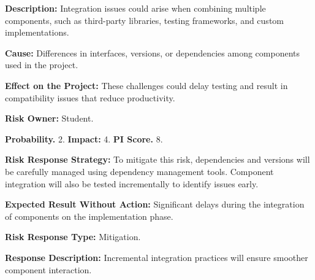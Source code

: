 \textbf{Description:} Integration issues could arise when combining multiple components, such as third-party libraries, testing frameworks, and custom implementations.

\textbf{Cause:} Differences in interfaces, versions, or dependencies among components used in the project.

\textbf{Effect on the Project:} These challenges could delay testing and result in compatibility issues that reduce productivity.

\textbf{Risk Owner:} Student.

\textbf{Probability.} 2. \textbf{Impact:} 4. \textbf{PI Score.} 8.

\textbf{Risk Response Strategy:} To mitigate this risk, dependencies and versions will be carefully managed using dependency management tools. Component integration will also be tested incrementally to identify issues early.

\textbf{Expected Result Without Action:} Significant delays during the integration of components on the implementation phase.

\textbf{Risk Response Type:} Mitigation.

\textbf{Response Description:} Incremental integration practices will ensure smoother component interaction.
